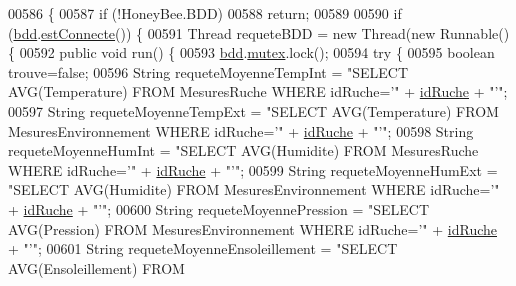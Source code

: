 \begin{DoxyCode}
00586     \{
00587         \textcolor{keywordflow}{if} (!HoneyBee.BDD)
00588             \textcolor{keywordflow}{return};
00589 
00590         \textcolor{keywordflow}{if} (\hyperlink{classfr_1_1campus_1_1laurainc_1_1honeybee_1_1_ruche_a0eb43a2b63fb83e9d5af6cd6b754c7da}{bdd}.\hyperlink{classfr_1_1campus_1_1laurainc_1_1honeybee_1_1_base_de_donnees_a735f54c2c183a595c9a9a5ba947491f5}{estConnecte}()) \{
00591             Thread requeteBDD = \textcolor{keyword}{new} Thread(\textcolor{keyword}{new} Runnable() \{
00592                 \textcolor{keyword}{public} \textcolor{keywordtype}{void} run() \{
00593                     \hyperlink{classfr_1_1campus_1_1laurainc_1_1honeybee_1_1_ruche_a0eb43a2b63fb83e9d5af6cd6b754c7da}{bdd}.\hyperlink{classfr_1_1campus_1_1laurainc_1_1honeybee_1_1_base_de_donnees_a0dd6f285a11459c086adea6080bed282}{mutex}.lock();
00594                     \textcolor{keywordflow}{try} \{
00595                         \textcolor{keywordtype}{boolean} trouve=\textcolor{keyword}{false};
00596                         String requeteMoyenneTempInt = \textcolor{stringliteral}{"SELECT AVG(Temperature) FROM MesuresRuche WHERE
       idRuche='"} + \hyperlink{classfr_1_1campus_1_1laurainc_1_1honeybee_1_1_ruche_aee4d51dd1634b799427d89e168cdadf4}{idRuche} + \textcolor{stringliteral}{"'"};
00597                         String requeteMoyenneTempExt = \textcolor{stringliteral}{"SELECT AVG(Temperature) FROM MesuresEnvironnement
       WHERE idRuche='"} + \hyperlink{classfr_1_1campus_1_1laurainc_1_1honeybee_1_1_ruche_aee4d51dd1634b799427d89e168cdadf4}{idRuche} + \textcolor{stringliteral}{"'"};
00598                         String requeteMoyenneHumInt = \textcolor{stringliteral}{"SELECT AVG(Humidite) FROM MesuresRuche WHERE
       idRuche='"} + \hyperlink{classfr_1_1campus_1_1laurainc_1_1honeybee_1_1_ruche_aee4d51dd1634b799427d89e168cdadf4}{idRuche} + \textcolor{stringliteral}{"'"};
00599                         String requeteMoyenneHumExt = \textcolor{stringliteral}{"SELECT AVG(Humidite) FROM MesuresEnvironnement WHERE
       idRuche='"} + \hyperlink{classfr_1_1campus_1_1laurainc_1_1honeybee_1_1_ruche_aee4d51dd1634b799427d89e168cdadf4}{idRuche} + \textcolor{stringliteral}{"'"};
00600                         String requeteMoyennePression = \textcolor{stringliteral}{"SELECT AVG(Pression) FROM MesuresEnvironnement
       WHERE idRuche='"} + \hyperlink{classfr_1_1campus_1_1laurainc_1_1honeybee_1_1_ruche_aee4d51dd1634b799427d89e168cdadf4}{idRuche} + \textcolor{stringliteral}{"'"};
00601                         String requeteMoyenneEnsoleillement = \textcolor{stringliteral}{"SELECT AVG(Ensoleillement) FROM
}
\end{DoxyCode}
